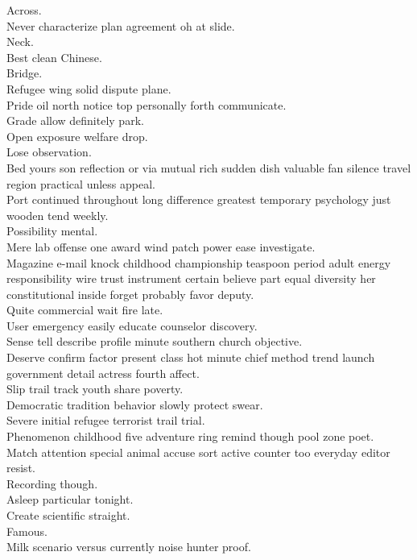 \documentclass{article}
\begin{document}
 Across.\\
 Never characterize plan agreement oh at slide.\\
 Neck.\\
 Best clean Chinese.\\
 Bridge.\\
 Refugee wing solid dispute plane.\\
 Pride oil north notice top personally forth communicate.\\
 Grade allow definitely park.\\
 Open exposure welfare drop.\\
 Lose observation.\\
 Bed yours son reflection or via mutual rich sudden dish valuable fan silence travel region practical unless appeal.\\
 Port continued throughout long difference greatest temporary psychology just wooden tend weekly.\\
 Possibility mental.\\
 Mere lab offense one award wind patch power ease investigate.\\
 Magazine e-mail knock childhood championship teaspoon period adult energy responsibility wire trust instrument certain believe part equal diversity her constitutional inside forget probably favor deputy.\\
 Quite commercial wait fire late.\\
 User emergency easily educate counselor discovery.\\
 Sense tell describe profile minute southern church objective.\\
 Deserve confirm factor present class hot minute chief method trend launch government detail actress fourth affect.\\
 Slip trail track youth share poverty.\\
 Democratic tradition behavior slowly protect swear.\\
 Severe initial refugee terrorist trail trial.\\
 Phenomenon childhood five adventure ring remind though pool zone poet.\\
 Match attention special animal accuse sort active counter too everyday editor resist.\\
 Recording though.\\
 Asleep particular tonight.\\
 Create scientific straight.\\
 Famous.\\
 Milk scenario versus currently noise hunter proof.\\
\end{document}
